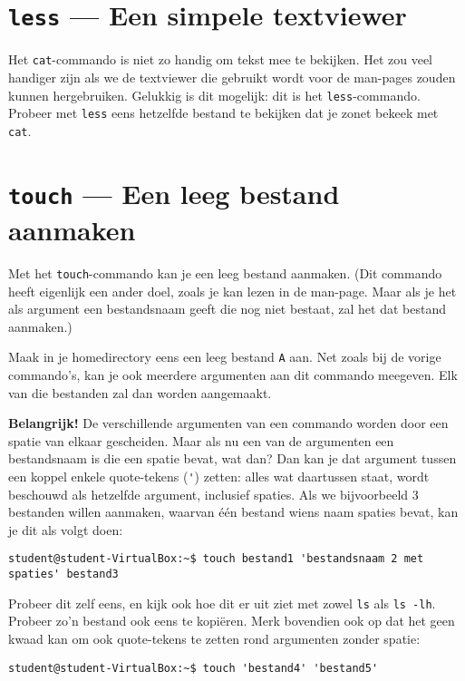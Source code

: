 \documentclass[a4paper,twoside,openany]{memoir}
\begin{document}
\section{\texttt{less} --- Een simpele textviewer}

Het \verb!cat!-commando is niet zo handig om tekst mee te bekijken. Het zou veel
handiger zijn als we de textviewer die gebruikt wordt voor de man-pages zouden
kunnen hergebruiken. Gelukkig is dit mogelijk: dit is het \verb!less!-commando.
Probeer met \verb!less! eens hetzelfde bestand te bekijken dat je zonet bekeek
met \verb!cat!.

\section{\texttt{touch} --- Een leeg bestand aanmaken}

Met het \verb!touch!-commando kan je een leeg bestand aanmaken. (Dit commando
heeft eigenlijk een ander doel, zoals je kan lezen in de man-page. Maar als je
het als argument een bestandsnaam geeft die nog niet bestaat, zal het dat
bestand aanmaken.)

Maak in je homedirectory eens een leeg bestand \verb!A! aan. Net zoals bij de
vorige commando's, kan je ook meerdere argumenten aan dit commando meegeven. Elk
van die bestanden zal dan worden aangemaakt.

\textbf{Belangrijk!} De verschillende argumenten van een commando worden door
een spatie van elkaar gescheiden. Maar als nu een van de argumenten een
bestandsnaam is die een spatie bevat, wat dan? Dan kan je dat argument tussen
een koppel enkele quote-tekens (\verb!'!) zetten: alles wat daartussen staat,
wordt beschouwd als hetzelfde argument, inclusief spaties. Als we bijvoorbeeld 3
bestanden willen aanmaken, waarvan één bestand wiens naam spaties bevat, kan je
dit als volgt doen:

\begin{verbatim}
student@student-VirtualBox:~$ touch bestand1 'bestandsnaam 2 met spaties' bestand3
\end{verbatim}

Probeer dit zelf eens, en kijk ook hoe dit er uit ziet met zowel \verb!ls! als
\verb!ls -lh!. Probeer zo'n bestand ook eens te kopiëren. Merk bovendien ook op
dat het geen kwaad kan om ook quote-tekens te zetten rond argumenten zonder
spatie:

\begin{verbatim}
student@student-VirtualBox:~$ touch 'bestand4' 'bestand5'
\end{verbatim}
\end{document}
